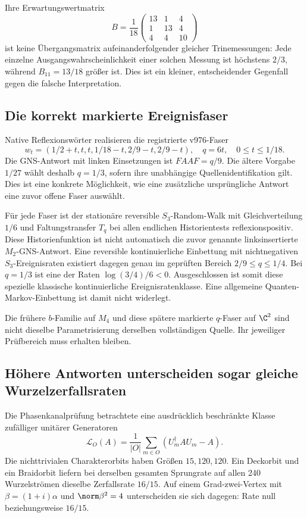 Ihre Erwartungswertmatrix
\begin{equation}
B=\frac1{18}\begin{pmatrix}13&1&4\\1&13&4\\4&4&10\end{pmatrix}
\end{equation}
ist keine Übergangsmatrix aufeinanderfolgender gleicher Trinemessungen: Jede einzelne Ausgangswahrscheinlichkeit einer solchen Messung ist höchstens $2/3$, während $B_{11}=13/18$ größer ist. Dies ist ein kleiner, entscheidender Gegenfall gegen die falsche Interpretation.

\subsection{Die korrekt markierte Ereignisfaser}
Native Reflexionswörter realisieren die registrierte v976-Faser
\begin{equation}
w_t=(1/2+t,t,t,1/18-t,2/9-t,2/9-t),
\quad q=6t,\quad0\le t\le1/18.
\end{equation}
Die GNS-Antwort mit linken Einsetzungen ist $FAAF=q/9$. Die ältere Vorgabe $1/27$ wählt deshalb $q=1/3$, sofern ihre unabhängige Quellenidentifikation gilt. Dies ist eine konkrete Möglichkeit, wie eine zusätzliche ursprüngliche Antwort eine zuvor offene Faser auswählt.

Für jede Faser ist der stationäre reversible $S_3$-Random-Walk mit Gleichverteilung $1/6$ und Faltungstransfer $T_q$ bei allen endlichen Historientests reflexionspositiv. Diese Historienfunktion ist nicht automatisch die zuvor genannte linksinsertierte $M_2$-GNS-Antwort. Eine reversible kontinuierliche Einbettung mit nichtnegativen $S_3$-Ereignisraten existiert dagegen genau im geprüften Bereich $2/9\le q\le1/4$. Bei $q=1/3$ ist eine der Raten $\log(3/4)/6<0$. Ausgeschlossen ist somit diese spezielle klassische kontinuierliche Ereignisratenklasse. Eine allgemeine Quanten-Markov-Einbettung ist damit nicht widerlegt.

Die frühere $b$-Familie auf $M_4$ und diese spätere markierte $q$-Faser auf $\C^2$ sind nicht dieselbe Parametrisierung derselben vollständigen Quelle. Ihr jeweiliger Prüfbereich muss erhalten bleiben.

\subsection{Höhere Antworten unterscheiden sogar gleiche Wurzelzerfallsraten}
Die Phasenkanalprüfung betrachtete eine ausdrücklich beschränkte Klasse zufälliger unitärer Generatoren
\begin{equation}
\mathcal L_O(A)=\frac1{|O|}\sum_{m\in O}(U_m^\dagger A U_m-A).
\end{equation}
Die nichttrivialen Charakterorbits haben Größen $15,120,120$. Ein Deckorbit und ein Braidorbit liefern bei derselben gesamten Sprungrate auf allen 240 Wurzelströmen dieselbe Zerfallsrate $16/15$. Auf einem Grad-zwei-Vertex mit $\beta=(1+i)\alpha$ und $\norm\beta^2=4$ unterscheiden sie sich dagegen: Rate null beziehungsweise $16/15$.

